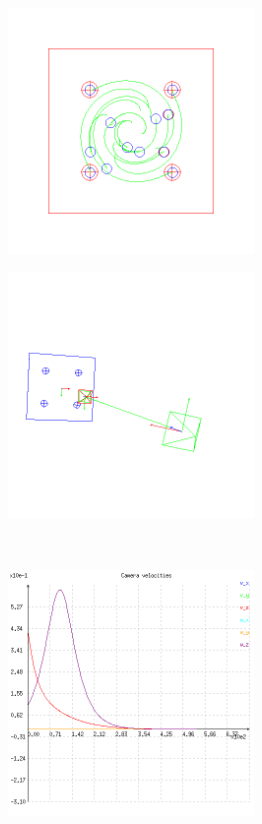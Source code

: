 \begin{figure}[ht!]
\begin{mdframed}[linecolor=black!30,backgroundcolor=black!5]
  \centering
  \begin{subfigure}{.48\linewidth}
    \centering
    \includegraphics[width=65mm]{figures/plots/ex4pimage.png}
    \caption{}
    \label{fig:ex4pimage}
  \end{subfigure}
  \begin{subfigure}{.48\linewidth}
    \centering
    \includegraphics[width=65mm]{figures/plots/ex4pscene.png}
    \caption{}
    \label{fig:ex4pscene}
  \end{subfigure}
  \\
  \begin{subfigure}{.48\linewidth}
    \centering
    \includegraphics[width=65mm]{figures/plots/ex4pvelocity.png}

\end{subfigure}
\end{mdframed}
\end{figure}
